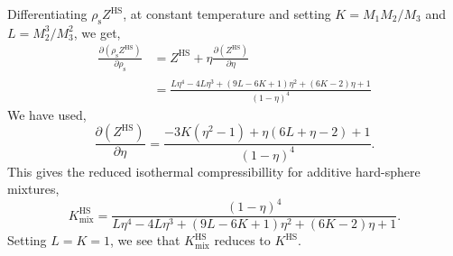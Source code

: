 \documentclass[english]{../thermomemo/thermomemo}
\newcommand{\pone}[3]{\frac{\partial #1}{\partial #2}_{#3}}%
\newcommand*{\lb}{\left(}
\newcommand*{\rb}{\right)}
\newcommand{\hs}{\text{HS}\xspace}
\newcommand{\seg}{\ensuremath{\text{s}}\xspace}
\newcommand{\mix}{\ensuremath{\text{mix}}\xspace}
\begin{document}
Differentiating $\rho_\seg Z^\hs$, at constant temperature and setting $K=M_1M_2/M_3$ and $L=M_2^3/M_3^2$, we get,
\begin{align}
  \label{eq:d_rZ_HS_mix}
  \pone{\lb \rho_\seg Z^\hs \rb}{\rho_\seg}{} &= Z^\hs + \eta \pone{\lb Z^\hs \rb}{\eta}{} \nonumber \\
  &= \frac{L \eta^4 - 4 L \eta^3 + \lb 9 L - 6 K + 1 \rb \eta^2 + \lb 6 K - 2 \rb \eta + 1}{\lb 1 - \eta \rb^4}
\end{align}
We have used,
\begin{equation}
  \label{eq:d_Z_HS_mix}
 \pone{\lb Z^\hs \rb}{\eta}{} = \frac{-3 K (\eta^2 - 1) + \eta \lb 6 L + \eta - 2\rb + 1}{\lb 1 - \eta\rb^4}.
\end{equation}
This gives the reduced isothermal compressibillity for additive hard-sphere mixtures,
\begin{equation}
  \label{eq:K_HS_mix}
  K_\mix^\hs = \frac{\lb 1 - \eta \rb^4}{ L \eta^4 - 4 L \eta^3 + \lb 9 L - 6 K + 1 \rb \eta^2 + \lb 6 K - 2 \rb \eta + 1}.
\end{equation}
Setting $L=K=1$, we see that $K_\mix^\hs$ reduces to $K^\hs$.
\end{document}
